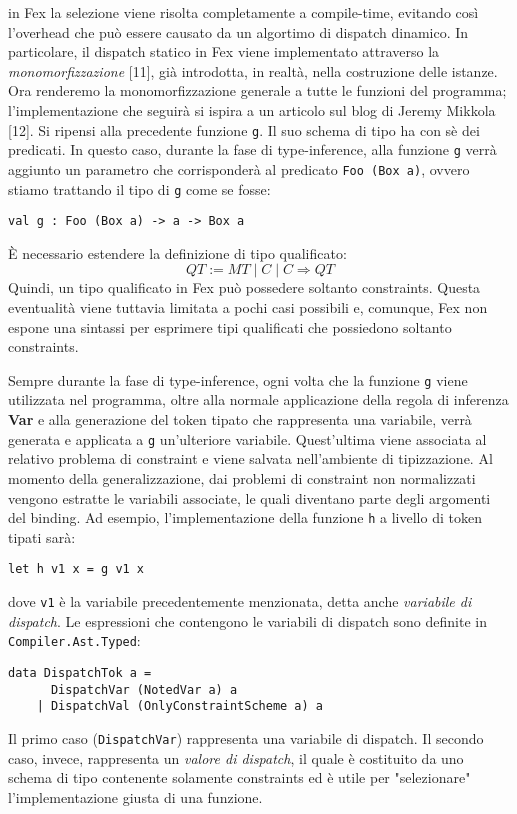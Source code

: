 \documentclass[10pt,a4paper]{article}
\begin{document}
in Fex la selezione viene risolta completamente a compile-time, evitando così l'overhead che può essere causato
da un algortimo di dispatch dinamico. In particolare, il dispatch statico in Fex viene implementato attraverso
la \textit{monomorfizzazione} [11], già introdotta, in realtà, nella costruzione delle istanze. Ora renderemo la
monomorfizzazione generale a tutte le funzioni del programma; l'implementazione che seguirà si ispira a un articolo
sul blog di Jeremy Mikkola [12]. Si ripensi alla precedente funzione \texttt{g}. Il suo
schema di tipo ha con sè dei predicati. In questo caso, durante la fase di type-inference, alla funzione \texttt{g}
verrà aggiunto un parametro che corrisponderà al predicato \texttt{Foo (Box a)}, ovvero stiamo trattando il tipo di
\texttt{g} come se fosse:
\begin{lstlisting}
val g : Foo (Box a) -> a -> Box a
\end{lstlisting}
\`E necessario estendere la definizione di tipo qualificato:
\[ QT := MT \; | \; C \; | \; C \Rightarrow QT \]
Quindi, un tipo qualificato in Fex può possedere soltanto constraints. Questa eventualità viene tuttavia limitata
a pochi casi possibili e, comunque, Fex non espone una sintassi per esprimere tipi qualificati che possiedono
soltanto constraints.

Sempre durante la fase di type-inference, ogni volta che la funzione \texttt{g} viene utilizzata nel programma, oltre
alla normale applicazione della regola di inferenza \textbf{Var} e alla generazione del token tipato che rappresenta
una variabile, verrà generata e applicata a \texttt{g} un'ulteriore variabile. Quest'ultima viene associata al
relativo problema di constraint e viene salvata nell'ambiente di tipizzazione. Al momento della generalizzazione,
dai problemi di constraint non normalizzati vengono estratte le variabili associate, le quali diventano parte degli
argomenti del binding. Ad esempio, l'implementazione della funzione \texttt{h} a livello di token tipati sarà:
\begin{lstlisting}
let h v1 x = g v1 x
\end{lstlisting}
dove \texttt{v1} è la variabile precedentemente menzionata, detta anche \textit{variabile di dispatch}. Le espressioni
che contengono le variabili di dispatch sono definite in \texttt{Compiler.Ast.Typed}:
\begin{lstlisting}
data DispatchTok a =
      DispatchVar (NotedVar a) a
    | DispatchVal (OnlyConstraintScheme a) a
\end{lstlisting}
Il primo caso (\texttt{DispatchVar}) rappresenta una variabile di dispatch. Il secondo caso, invece, rappresenta un
\textit{valore di dispatch}, il quale è costituito da uno schema di tipo contenente solamente constraints ed è utile
per "selezionare" l'implementazione giusta di una funzione.
\end{document}
